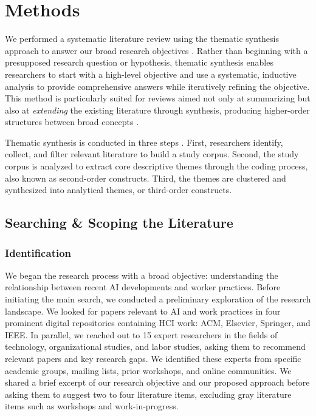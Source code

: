 \section{Methods}
We performed a systematic literature review using the thematic synthesis approach to answer our broad research objectives \cite{Thomas2008}. Rather than beginning with a presupposed research question or hypothesis, thematic synthesis enables researchers to start with a high-level objective and use a systematic, inductive analysis to provide comprehensive answers while iteratively refining the objective. This method is particularly suited for reviews aimed not only at summarizing but also at \textit{extending} the existing literature through synthesis, producing higher-order structures between broad concepts \cite{Xiao_Watson_2019}.


Thematic synthesis is conducted in three steps \cite{Thomas2008}. First, researchers identify, collect, and filter relevant literature to build a study corpus. Second, the study corpus is analyzed to extract core descriptive themes through the coding process, also known as second-order constructs. Third, the themes are clustered and synthesized into analytical themes, or third-order constructs.

\subsection{Searching \& Scoping the Literature}

\subsubsection{Identification}
We began the research process with a broad objective: understanding the relationship between recent AI developments and worker practices. Before initiating the main search, we conducted a preliminary exploration of the research landscape. We looked for papers relevant to AI and work practices in four prominent digital repositories containing HCI work: ACM, Elsevier, Springer, and IEEE. In parallel, we reached out to 15 expert researchers in the fields of technology, organizational studies, and labor studies, asking them to recommend relevant papers and key research gaps. We identified these experts from specific academic groups, mailing lists, prior workshops, and online communities. We shared a brief excerpt of our research objective and our proposed approach before asking them to suggest two to four literature items, excluding gray literature items such as workshops and work-in-progress.

